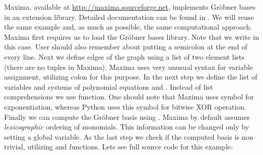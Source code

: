 Maxima, available at \href{http://maxima.sourceforge.net}{http://maxima.sourceforge.net}, implements Gröbner bases in an extension library.
Detailed documentation can be found in \cite{MaximaGroebner}. We will reuse the same example and, as much as
possible, the same computational approach. Maxima first requires us to load the Gröbner bases library.
Note that we write  in this case. User should also remember about putting a semicolon at the end
of every line. Next we define edges of the graph using a list of two element lists (there are no tuples in
Maxima).  Maxima uses very unusual syntax for variable assignment, utilizing colon for this purpose. In the
next step we define the list of variables  and systems of polynomial equations  and .
Instead of list comprehensions we use  function. One should note that Maxima uses \code{\textasciicircum{}}
symbol for exponentiation, whereas Python uses this symbol for bitwise XOR operation. Finally we can compute
the Gröbner basis using . Maxima by default assumes \emph{lexicographic} ordering
of monomials. This information can be changed only by setting a global variable. As the last step we
check if the computed basis is non--trivial, utilizing  and  functions. Lets
see full source code for this example:

